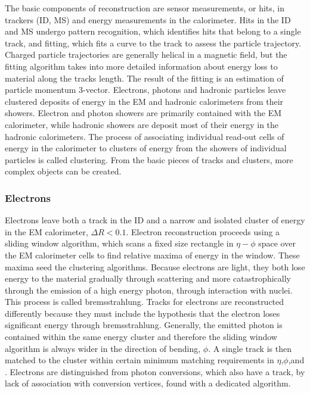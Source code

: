 The basic components of reconstruction are sensor measurements, or hits, in trackers (ID, MS) and energy measurements in the calorimeter. Hits in the ID and MS undergo pattern recognition, which identifies hits that belong to a single track, and fitting, which fits a curve to the track to assess the particle trajectory. Charged particle trajectories are generally helical in a magnetic field, but the fitting algorithm takes into more detailed information about energy loss to material along the tracks length. The result of the fitting is an estimation of particle momentum 3-vector. Electrons, photons and hadronic particles leave clustered deposits of energy in the EM and hadronic calorimeters from their showers. Electron and photon showers are primarily contained with the EM calorimeter, while hadronic showers are deposit most of their energy in the hadronic calorimeters. The process of associating individual read-out cells of energy in the calorimeter to clusters of energy from the showers of individual particles is called clustering. From the basic pieces of tracks and clusters, more complex objects can be created. 

\subsubsection{Electrons}

Electrons leave both a track in the ID and a narrow and isolated cluster of energy in the EM calorimeter, $\Delta R < 0.1$. Electron reconstruction proceeds using a sliding window algorithm, which scans a fixed size rectangle in $\eta-\phi$ space over the EM calorimeter cells to find relative maxima of energy in the window\cite{ATLAS-CONF-2014-032}. These maxima seed the clustering algorithms. Because electrons are light, they both lose energy to the material gradually through scattering and more catastrophically through the emission of a high energy photon, through interaction with nuclei. This process is called bremsstrahlung. Tracks for electrons are reconstructed differently because they must include the hypothesis that the electron loses significant energy through bremsstrahlung. Generally, the emitted photon is contained within the same energy cluster and therefore the sliding window algorithm is always wider in the direction of bending, $\phi$. A single track is then matched to the cluster within certain minimum matching requirements in $\eta$,$\phi$,and \pt. Electrons are distinguished from photon conversions, which also have a track, by lack of association with conversion vertices, found with a dedicated algorithm.

